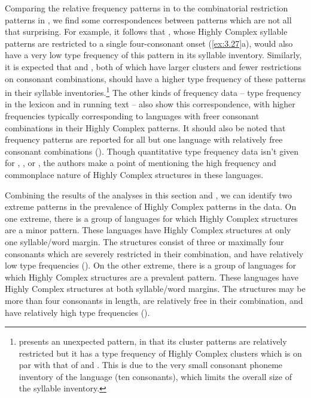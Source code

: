   Comparing the relative frequency patterns in  to the combinatorial restriction patterns in , we find some correspondences between patterns which are not all that surprising. For example, it follows that , whose Highly Complex syllable patterns are restricted to a single four-consonant onset (\ref{ex:3.27}a), would also have a very low type frequency of this pattern in its syllable inventory. Similarly, it is expected that  and , both of which have larger clusters and fewer restrictions on consonant combinations, should have a higher type frequency of these patterns in their syllable inventories.\footnote{{ presents an unexpected pattern, in that its cluster patterns are relatively restricted but it has a type frequency of Highly Complex clusters which is on par with that of  and . This is due to the very small consonant phoneme inventory of the language (ten consonants), which limits the overall size of the syllable inventory.}} The other kinds of frequency data -- type frequency in the lexicon and in running text -- also show this correspondence, with higher frequencies typically corresponding to languages with freer consonant combinations in their Highly Complex patterns. It should also be noted that frequency patterns are reported for all but one language with relatively free consonant combinations (). Though quantitative type frequency data isn’t given for , , or , the authors make a point of mentioning the high frequency and commonplace nature of Highly Complex structures in these languages. 

  Combining the results of the analyses in this section and , we can identify two extreme patterns in the prevalence of Highly Complex patterns in the data. On one extreme, there is a group of languages for which Highly Complex structures are a minor pattern. These languages have Highly Complex structures at only one syllable/word margin. The structures consist of three or maximally four consonants which are severely restricted in their combination, and have relatively low type frequencies (). On the other extreme, there is a group of languages for which Highly Complex structures are a prevalent pattern. These languages have Highly Complex structures at both syllable/word margins. The structures may be more than four consonants in length, are relatively free in their combination, and have relatively high type frequencies ().

